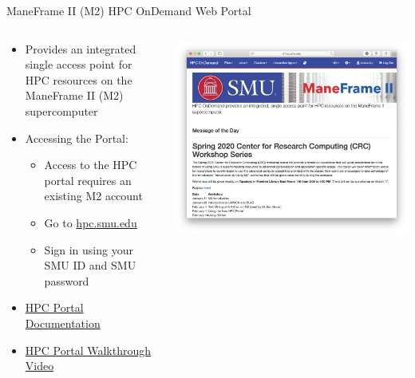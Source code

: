 \documentclass[aspectratio=169]{beamer}
\begin{document}
\begin{frame}{ManeFrame II (M2) HPC OnDemand Web Portal}
\begin{columns}[c]
\begin{column}{0.5\textwidth}
\begin{itemize}
\item Provides an integrated single access point for HPC resources on the
ManeFrame II (M2) supercomputer
\item Accessing the Portal:
\begin{itemize}
\item Access to the HPC portal requires an existing M2 account
\item Go to \url{hpc.smu.edu}
\item Sign in using your SMU ID and SMU password
\end{itemize}
\item \href{https://s2.smu.edu/hpc/documentation/portal.html}{HPC Portal
Documentation}
\item
\href{https://s2.smu.edu/hpc/documentation/portal.html\#remote-desktop}{HPC
Portal Walkthrough Video}
\end{itemize}
\end{column}
\begin{column}{0.5\textwidth}
\includegraphics[width=\linewidth]{figures/portal.png}
\end{column}
\end{columns}
\end{frame}


\end{document}
